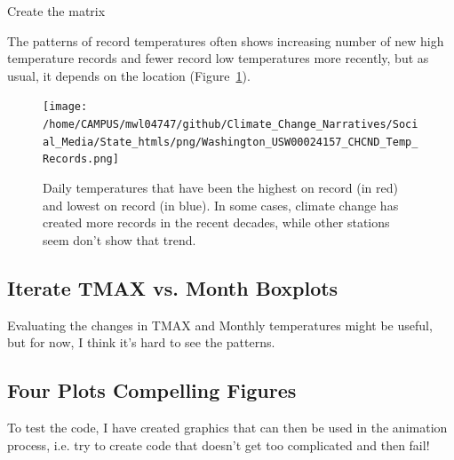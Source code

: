 \documentclass{article}
\begin{document}
Create the matrix
\begin{knitrout}
\color{fgcolor}\begin{kframe}


{\ttfamily\noindent\bfseries\color{errorcolor}{\#\# Error in TMAX.mat.noleap[j, year.seq\$Col[year.seq\$Year == i]] <- CHCND.noleap\$TMAX[CHCND.noleap\$Year == : replacement has length zero}}\end{kframe}
\end{knitrout}




The patterns of record temperatures often shows increasing number of new high temperature records  and fewer record low temperatures more recently, but as usual, it depends on the location (Figure~\ref{fig:Records}).
\begin{figure}
\texttt{[image: /home/CAMPUS/mwl04747/github/Climate\_Change\_Narratives/Social\_Media/State\_htmls/png/Washington\_USW00024157\_CHCND\_Temp\_Records.png]}
\caption{Daily temperatures that have been the highest on record (in red) and lowest on record (in blue). In some cases, climate change has created more records in the recent decades, while other stations seem don't show that trend.}
\label{fig:Records}
\end{figure}

\subsection{Iterate TMAX vs. Month Boxplots}

Evaluating the changes in TMAX and Monthly temperatures might be useful, but for now, I think it's hard to see the patterns. 




\subsection{Four Plots Compelling Figures}

To test the code, I have created graphics that can then be used in the animation process, i.e. try to create code that doesn't get too complicated and then fail! 

\begin{knitrout}
\color{fgcolor}\begin{kframe}


{\ttfamily\noindent\bfseries\color{errorcolor}{\#\# Error in seq(min(GSOM\$Year), max(GSOM\$Year), by = 2): object 'GSOM' not found}}\end{kframe}
\end{knitrout}
\end{document}
